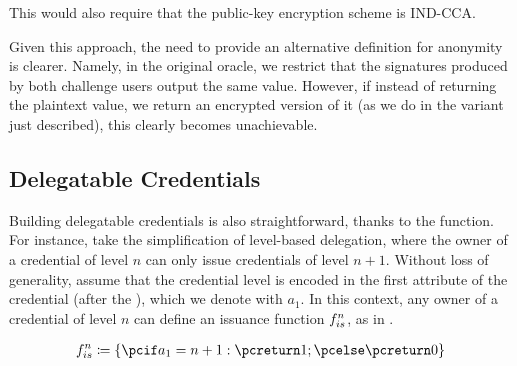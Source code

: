 This would also require that the public-key encryption scheme is IND-CCA.

Given this approach, the need to provide an alternative definition for anonymity
is clearer. Namely, in the original \CHALb oracle, we restrict that the
signatures produced by both challenge users output the same \yeval value.
However, if instead of returning the plaintext \yeval value, we return an
encrypted version of it (as we do in the variant just described), this clearly
becomes unachievable.


\subsection{Delegatable Credentials}
\label{ssec:uas-delcred}

Building delegatable credentials is also straightforward, thanks to the \fissue
function. For instance, take the simplification of level-based delegation, where
the owner of a credential of level $n$ can only issue credentials of level
$n+1$. Without loss of generality, assume that the credential level is encoded
in the first attribute of the credential (after the \usk), which we denote with
$a_1$. In this context, any owner of a credential of level $n$ can define an
issuance function $f_{is}^n$, as in .

\begin{align}
  \fissue^n \coloneqq \lbrace \pcif a_1 = n+1: \pcreturn 1;
  \pcelse \pcreturn 0 \rbrace \label{eq:uas-delcred-func}
\end{align}


